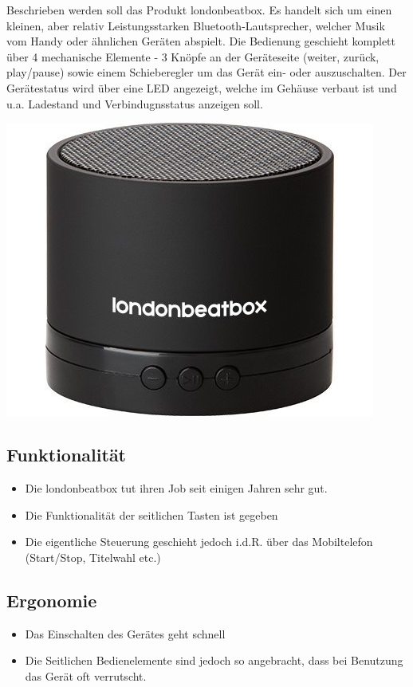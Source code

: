 \documentclass[a4paper,10pt]{article}
\begin{document}
\kopf
\renewcommand{\figurename}{Figure}

Beschrieben werden soll das Produkt londonbeatbox. Es handelt sich um einen kleinen, aber relativ Leistungsstarken Bluetooth-Lautsprecher, welcher Musik vom Handy oder ähnlichen Geräten abspielt. Die Bedienung geschieht komplett über 4 mechanische Elemente - 3 Knöpfe an der Geräteseite (weiter, zurück, play/pause) sowie einem Schieberegler um das Gerät ein- oder auszuschalten. Der Gerätestatus wird über eine LED angezeigt, welche im Gehäuse verbaut ist und u.a. Ladestand und Verbindugnsstatus anzeigen soll.

\includegraphics[scale=0.5]{img.jpg}

\subsection{Funktionalität}
\begin{itemize}
    \item Die londonbeatbox tut ihren Job seit einigen Jahren sehr gut. 
    \item Die Funktionalität der seitlichen Tasten ist gegeben
    \item Die eigentliche Steuerung geschieht jedoch i.d.R. über das Mobiltelefon (Start/Stop, Titelwahl etc.)
\end{itemize}

\subsection{Ergonomie}
\begin{itemize}
\item Das Einschalten des Gerätes geht schnell
\item Die Seitlichen Bedienelemente sind jedoch so angebracht, dass bei Benutzung das Gerät oft verrutscht.
\end{itemize}
\end{document}
